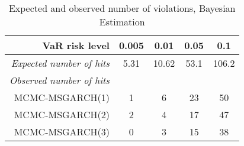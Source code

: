 \documentclass[12pt,a4paper]{article}
\begin{document}
\begin{table}[b]
\centering
\caption{Expected and observed number of violations, Bayesian Estimation}
\label{table:hitrate_mcmc}
\begin{tabular}{@{}rlclclclcl@{}}
\toprule
\multicolumn{2}{r}{VaR risk level}     & \multicolumn{2}{c}{0.005} & \multicolumn{2}{c}{0.01}  & \multicolumn{2}{c}{0.05} & \multicolumn{2}{c}{0.1}   \\ \midrule
\multicolumn{2}{r}{\textit{Expected number of hits}} & \multicolumn{2}{c}{5.31}  & \multicolumn{2}{c}{10.62} & \multicolumn{2}{c}{53.1} & \multicolumn{2}{c}{106.2} \\
\multicolumn{2}{r}{\textit{Observed number of hits}} & \multicolumn{8}{c}{}                                                                                         \\
\multicolumn{2}{r}{MCMC-MSGARCH(1)}         & \multicolumn{2}{c}{1}     & \multicolumn{2}{c}{6}     & \multicolumn{2}{c}{23}   & \multicolumn{2}{c}{50}    \\
\multicolumn{2}{r}{MCMC-MSGARCH(2)}         & \multicolumn{2}{c}{2}     & \multicolumn{2}{c}{4}     & \multicolumn{2}{c}{17}   & \multicolumn{2}{c}{47}    \\
\multicolumn{2}{r}{MCMC-MSGARCH(3)}         & \multicolumn{2}{c}{0}     & \multicolumn{2}{c}{3}     & \multicolumn{2}{c}{15}   & \multicolumn{2}{c}{38}    \\ \bottomrule
\end{tabular}
\end{table}
\end{document}
